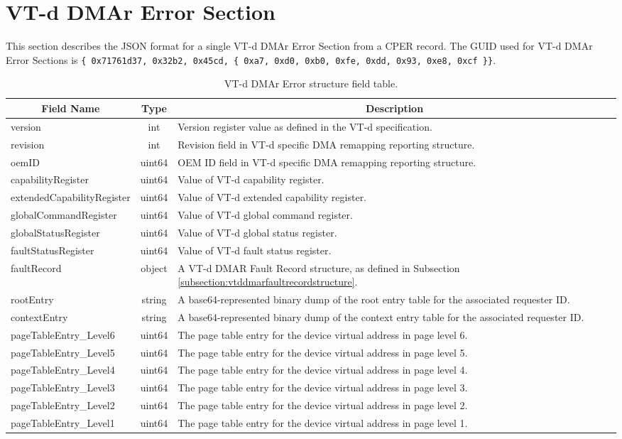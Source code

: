\documentclass{report}
\newcommand*{\thead}[1]{\multicolumn{1}{|c|}{\bfseries #1}}
\newcommand*{\jsontable}[1]{
    \begin{table}[!ht]
    \label{#1}
    \centering
    \begin{adjustbox}{center}
    \begin{tabular}{|l|c|p{8cm}|}
    \hline
    \thead{Field Name} & \thead{Type} & \thead{Description} \\
    \hline
}
\newcommand*{\jsontableend}[1]{
    \hline
    \end{tabular}
    \end{adjustbox}
    \caption{#1}
    \label{table:#1}
    \end{table}
    \FloatBarrier
}
\begin{document}
\section{VT-d DMAr Error Section}
\label{section:vtddmarerrorsection}
This section describes the JSON format for a single VT-d DMAr Error Section from a CPER record. The GUID used for VT-d DMAr Error Sections is \texttt{\{ 0x71761d37, 0x32b2, 0x45cd, \{ 0xa7, 0xd0, 0xb0, 0xfe, 0xdd, 0x93, 0xe8, 0xcf \}\}}.
\jsontable{table:vtddmarerrorsection}
version & int & Version register value as defined in the VT-d specification.\\
\hline
revision & int & Revision field in VT-d specific DMA remapping reporting structure.\\
\hline
oemID & uint64 & OEM ID field in VT-d specific DMA remapping reporting structure.\\
\hline
capabilityRegister & uint64 & Value of VT-d capability register.\\
\hline
extendedCapabilityRegister & uint64 & Value of VT-d extended capability register.\\
\hline
globalCommandRegister & uint64 & Value of VT-d global command register.\\
\hline
globalStatusRegister & uint64 & Value of VT-d global status register.\\
\hline
faultStatusRegister & uint64 & Value of VT-d fault status register.\\
\hline
faultRecord & object & A VT-d DMAR Fault Record structure, as defined in Subsection \ref{subsection:vtddmarfaultrecordstructure}.\\
\hline
rootEntry & string & A base64-represented binary dump of the root entry table for the associated requester ID.\\
\hline
contextEntry & string & A base64-represented binary dump of the context entry table for the associated requester ID.\\
\hline
pageTableEntry\_Level6 & uint64 & The page table entry for the device virtual address in page level 6.\\
\hline
pageTableEntry\_Level5 & uint64 & The page table entry for the device virtual address in page level 5.\\
\hline
pageTableEntry\_Level4 & uint64 & The page table entry for the device virtual address in page level 4.\\
\hline
pageTableEntry\_Level3 & uint64 & The page table entry for the device virtual address in page level 3.\\
\hline
pageTableEntry\_Level2 & uint64 & The page table entry for the device virtual address in page level 2.\\
\hline
pageTableEntry\_Level1 & uint64 & The page table entry for the device virtual address in page level 1.\\
\jsontableend{VT-d DMAr Error structure field table.}
\end{document}
